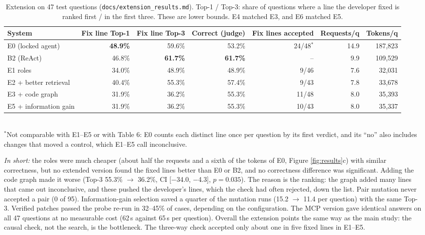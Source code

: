 \documentclass[10pt,a4paper]{article}
\newcommand{\code}[1]{\texttt{\small #1}}
\newcommand{\m}{$-$}
\begin{document}
\begin{table}[!htb]
\centering\small
\caption{Extension on 47 test questions (\code{docs/extension\_results.md}). Top-1 / Top-3: share of questions where a
line the developer fixed is ranked first / in the first three. These are lower bounds. E4 matched E3, and E6 matched
E5.}
\setlength{\tabcolsep}{4pt}
\begin{tabular}{lrrrrrr}
\toprule
System & Fix line Top-1 & Fix line Top-3 & Correct (judge) & Fix lines accepted & Requests/q & Tokens/q\\
\midrule
E0 (locked agent) & \textbf{48.9\%} & 59.6\% & 53.2\% & 24/48$^{*}$ & 14.9 & 187,823\\
B2 (ReAct) & 46.8\% & \textbf{61.7\%} & \textbf{61.7\%} & -- & 9.9 & 109,529\\
E1 roles & 34.0\% & 48.9\% & 48.9\% & 9/46 & 7.6 & 32,031\\
E2 + better retrieval & 40.4\% & 55.3\% & 57.4\% & 9/43 & 7.8 & 33,678\\
E3 + code graph & 31.9\% & 36.2\% & 55.3\% & 11/48 & 8.0 & 35,393\\
E5 + information gain & 31.9\% & 36.2\% & 55.3\% & 10/43 & 8.0 & 35,337\\
\bottomrule
\end{tabular}\\[2pt]
\footnotesize $^{*}$Not comparable with E1--E5 or with Table 6: E0 counts each distinct line once per question by its
first verdict, and its ``no'' also includes changes that moved a control, which E1--E5 call inconclusive.
\end{table}

\emph{In short:} the roles were much cheaper (about half the requests and a sixth of the tokens of E0, Figure
\ref{fig:results}c) with similar correctness, but no extended version found the fixed lines better than E0 or B2, and no
correctness difference was significant. Adding the code graph made it worse (Top-3 55.3\% $\rightarrow$ 36.2\%, CI
[\m34.0, \m4.3], $p=0.035$). The reason is the ranking: the graph added many lines that came out inconclusive, and these
pushed the developer's lines, which the check had often rejected, down the list. Pair mutation never accepted a pair
(0 of 95). Information-gain selection saved a quarter of the mutation runs (15.2 $\rightarrow$ 11.4 per question) with
the same Top-3. Verified patches passed the probe re-run in 32--45\% of cases,
depending on the configuration. The MCP version gave identical answers on all 47 questions at no measurable cost (62\,s
against 65\,s per question). Overall the extension points the same way as the main study: the causal check, not the
search, is the bottleneck. The three-way check accepted only about one in five fixed lines in E1--E5.
\end{document}
